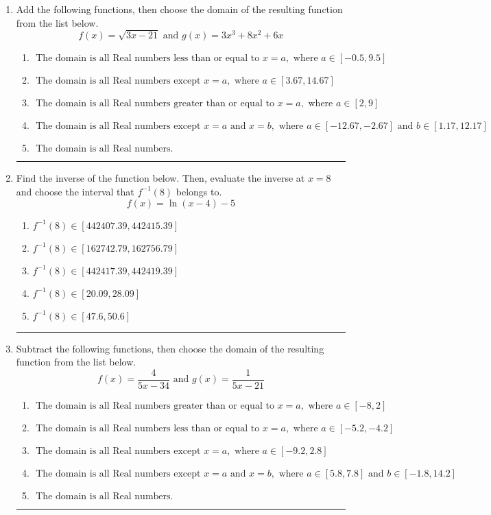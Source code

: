 \documentclass[14pt]{extbook}
\newcommand{\litem}[1]{\item#1\hspace*{-1cm}\rule{\textwidth}{0.4pt}}
\begin{document}
\begin{enumerate}
{\begin{enumerate}[label=\Alph*.]
\end{enumerate} }
\litem{
Add the following functions, then choose the domain of the resulting function from the list below.\[ f(x) = \sqrt{3x-21}  \text{ and } g(x) = 3x^{3} +8 x^{2} +6 x \]\begin{enumerate}[label=\Alph*.]
\item \( \text{ The domain is all Real numbers less than or equal to } x = a, \text{ where } a \in [-0.5, 9.5] \)
\item \( \text{ The domain is all Real numbers except } x = a, \text{ where } a \in [3.67, 14.67] \)
\item \( \text{ The domain is all Real numbers greater than or equal to } x = a, \text{ where } a \in [2, 9] \)
\item \( \text{ The domain is all Real numbers except } x = a \text{ and } x = b, \text{ where } a \in [-12.67, -2.67] \text{ and } b \in [1.17, 12.17] \)
\item \( \text{ The domain is all Real numbers. } \)

\end{enumerate} }
\litem{
Find the inverse of the function below. Then, evaluate the inverse at $x = 8$ and choose the interval that $f^{-1}(8)$ belongs to.\[ f(x) = \ln{(x-4)}-5 \]\begin{enumerate}[label=\Alph*.]
\item \( f^{-1}(8) \in [442407.39, 442415.39] \)
\item \( f^{-1}(8) \in [162742.79, 162756.79] \)
\item \( f^{-1}(8) \in [442417.39, 442419.39] \)
\item \( f^{-1}(8) \in [20.09, 28.09] \)
\item \( f^{-1}(8) \in [47.6, 50.6] \)

\end{enumerate} }
\litem{
Subtract the following functions, then choose the domain of the resulting function from the list below.\[ f(x) = \frac{4}{5x-34} \text{ and } g(x) = \frac{1}{5x-21} \]\begin{enumerate}[label=\Alph*.]
\item \( \text{ The domain is all Real numbers greater than or equal to } x = a, \text{ where } a \in [-8, 2] \)
\item \( \text{ The domain is all Real numbers less than or equal to } x = a, \text{ where } a \in [-5.2, -4.2] \)
\item \( \text{ The domain is all Real numbers except } x = a, \text{ where } a \in [-9.2, 2.8] \)
\item \( \text{ The domain is all Real numbers except } x = a \text{ and } x = b, \text{ where } a \in [5.8, 7.8] \text{ and } b \in [-1.8, 14.2] \)
\item \( \text{ The domain is all Real numbers. } \)


\end{enumerate}}
\end{enumerate}
\end{document}
